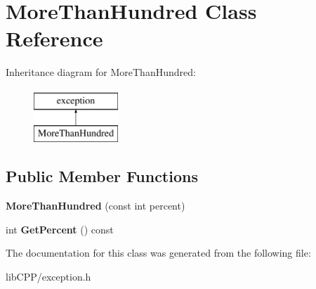 \hypertarget{classMoreThanHundred}{\section{More\-Than\-Hundred Class Reference}
\label{classMoreThanHundred}
}
Inheritance diagram for More\-Than\-Hundred\-:\begin{figure}[H]
\begin{center}
\leavevmode
\includegraphics[height=2.000000cm]{classMoreThanHundred}
\end{center}
\end{figure}
\subsection*{Public Member Functions}
\begin{DoxyCompactItemize}
\item 
\hypertarget{classMoreThanHundred_a993286e53b7c3e39f6f4fddfc71a4be9}{{\bfseries More\-Than\-Hundred} (const int percent)}\label{classMoreThanHundred_a993286e53b7c3e39f6f4fddfc71a4be9}

\item 
\hypertarget{classMoreThanHundred_a89a337ca5c812c9f81f697ff25ff10c8}{int {\bfseries Get\-Percent} () const }\label{classMoreThanHundred_a89a337ca5c812c9f81f697ff25ff10c8}

\end{DoxyCompactItemize}


The documentation for this class was generated from the following file\-:\begin{DoxyCompactItemize}
\item 
lib\-C\-P\-P/exception.\-h\end{DoxyCompactItemize}
